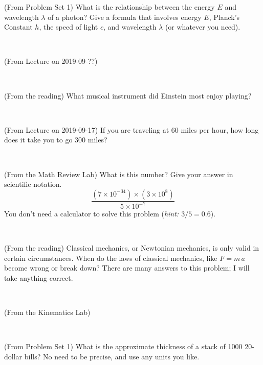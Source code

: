 \documentclass[12pt, letterpaper]{article}
\begin{document}
\begin{problem} (From Problem Set 1)
What is the relationship between the energy $E$ and wavelength
$\lambda$ of a photon? Give a formula that involves energy $E$,
Planck's Constant $h$, the speed of light $c$, and wavelength
$\lambda$ (or whatever you need).
\end{problem}

\vfill ~

\begin{problem} (From Lecture on 2019-09-??)
\end{problem}


\vfill ~

\begin{problem} (From the reading)
What musical instrument did Einstein most enjoy playing?
\end{problem}


\vfill ~

\begin{problem} (From Lecture on 2019-09-17)
If you are traveling at 60 miles per hour, how long does
it take you to go 300 miles?
\end{problem}


\vfill ~


\clearpage


\begin{problem} (From the Math Review Lab)
What is this number? Give your answer in scientific notation.
$$
\frac{(7\times10^{-34})\times(3\times10^8)}{5\times10^{-7}}
$$
You don't need a calculator to solve this problem (\textit{hint: $3/5=0.6$}).
\end{problem}


\vfill ~

\begin{problem} (From the reading)
Classical mechanics, or Newtonian mechanics, is only valid in certain
circumstances. When do the laws of classical mechanics, like $F =
m\,a$ become wrong or break down? There are many answers to this
problem; I will take anything correct.
\end{problem}


\vfill ~

\begin{problem} (From the Kinematics Lab)

\end{problem}


\vfill ~

\begin{problem} (From Problem Set 1)
What is the approximate thickness of a stack of 1000 20-dollar bills?
No need to be precise, and use any units you like.
\end{problem}
\end{document}
